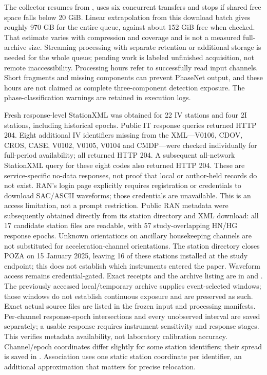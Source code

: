 The collector resumes from , uses six concurrent transfers and stops if shared free space falls below 20 GiB. Linear extrapolation from this download batch gives roughly 970 GB for the entire queue, against about 152 GiB free when checked. That estimate varies with compression and coverage and is not a measured full-archive size. Streaming processing with separate retention or additional storage is needed for the whole queue; pending work is labeled unfinished acquisition, not remote inaccessibility. Processing hours refer to successfully read input channels. Short fragments and missing components can prevent PhaseNet output, and these hours are not claimed as complete three-component detection exposure. The phase-classification warnings are retained in execution logs.

Fresh response-level StationXML was obtained for 22 IV stations and four 2I stations, including historical epochs. Public IT response queries returned HTTP 204. Eight additional IV identifiers missing from the XML---V0106, CDOV, CROS, CASE, V0102, V0105, V0104 and CMDP---were checked individually for full-period availability; all returned HTTP 204. A subsequent all-network StationXML query for these eight codes also returned HTTP 204. These are service-specific no-data responses, not proof that local or author-held records do not exist. RAN's login page explicitly requires registration or credentials to download SAC/ASCII waveforms; those credentials are unavailable. This is an access limitation, not a prompt restriction. Public RAN metadata were subsequently obtained directly from its station directory and XML download: all 17 candidate station files are readable, with 57 study-overlapping HN/HG response epochs. Unknown orientations on ancillary housekeeping channels are not substituted for acceleration-channel orientations. The station directory closes POZA on 15 January 2025, leaving 16 of these stations installed at the study endpoint; this does not establish which instruments entered the paper. Waveform access remains credential-gated. Exact receipts and the archive listing are in  and . The previously accessed local/temporary archive supplies event-selected windows; those windows do not establish continuous exposure and are preserved as such. Exact actual source files are listed in the frozen input and processing manifests. Per-channel response-epoch intersections and every unobserved interval are saved separately; a usable response requires instrument sensitivity and response stages. This verifies metadata availability, not laboratory calibration accuracy. Channel/epoch coordinates differ slightly for some station identifiers; their spread is saved in . Association uses one static station coordinate per identifier, an additional approximation that matters for precise relocation.

